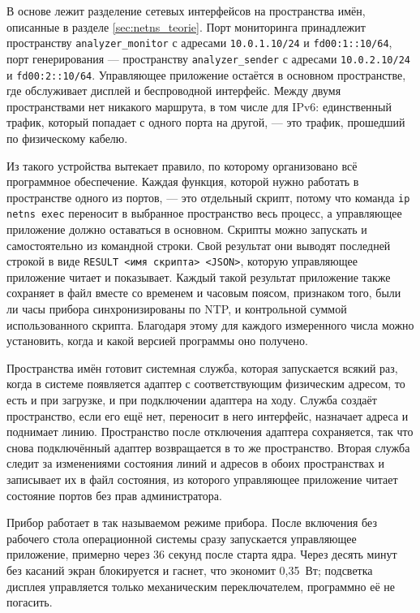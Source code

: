 В основе лежит разделение сетевых интерфейсов на пространства имён, описанные в разделе \ref{sec:netns_teorie}. Порт мониторинга принадлежит пространству \texttt{analyzer\_monitor} с адресами \texttt{10.0.1.10/24} и \texttt{fd00:1::10/64}, порт генерирования — пространству \texttt{analyzer\_sender} с адресами \texttt{10.0.2.10/24} и \texttt{fd00:2::10/64}. Управляющее приложение остаётся в основном пространстве, где обслуживает дисплей и беспроводной интерфейс. Между двумя пространствами нет никакого маршрута, в том числе для IPv6: единственный трафик, который попадает с одного порта на другой, — это трафик, прошедший по физическому кабелю.

Из такого устройства вытекает правило, по которому организовано всё программное обеспечение. Каждая функция, которой нужно работать в пространстве одного из портов, — это отдельный скрипт, потому что команда \texttt{ip netns exec} переносит в выбранное пространство весь процесс, а управляющее приложение должно оставаться в основном. Скрипты можно запускать и самостоятельно из командной строки. Свой результат они выводят последней строкой в виде \texttt{RESULT <имя скрипта> <JSON>}, которую управляющее приложение читает и показывает. Каждый такой результат приложение также сохраняет в файл вместе со временем и часовым поясом, признаком того, были ли часы прибора синхронизированы по NTP, и контрольной суммой использованного скрипта. Благодаря этому для каждого измеренного числа можно установить, когда и какой версией программы оно получено.

Пространства имён готовит системная служба, которая запускается всякий раз, когда в системе появляется адаптер с соответствующим физическим адресом, то есть и при загрузке, и при подключении адаптера на ходу. Служба создаёт пространство, если его ещё нет, переносит в него интерфейс, назначает адреса и поднимает линию. Пространство после отключения адаптера сохраняется, так что снова подключённый адаптер возвращается в то же пространство. Вторая служба следит за изменениями состояния линий и адресов в обоих пространствах и записывает их в файл состояния, из которого управляющее приложение читает состояние портов без прав администратора.

Прибор работает в так называемом режиме прибора. После включения без рабочего стола операционной системы сразу запускается управляющее приложение, примерно через 36 секунд после старта ядра. Через десять минут без касаний экран блокируется и гаснет, что экономит 0,35~Вт; подсветка дисплея управляется только механическим переключателем, программно её не погасить.

